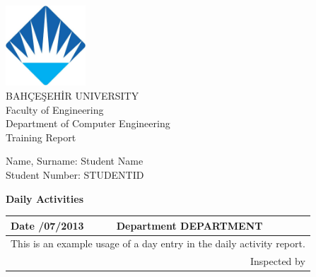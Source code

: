 \documentclass[pdftex,12pt,a4paper]{extreport}
\begin{document}
\begin{titlepage}
\begin{center}

\includegraphics[height=3cm,width=3cm]{bau.png}\\
[1.0cm]
\Large BAHÇEŞEHİR UNIVERSITY\\
[3.0cm]
\Large Faculty of Engineering\\
[3.0cm]
\Large Department of Computer Engineering\\
[3.0cm]
\large Training Report\\
[4.0cm]
\end{center}
\large Name, Surname:
\large Student Name\\
\large Student Number:
\large STUDENTID\\
\vfill

\end{titlepage}

\newenvironment{dailyactivity}[2]
{
    \newpage
    \begin{center}
    \textbf{Daily Activities}\\[1cm]
    \begin{tabular}{|p{2.5cm}|p{12.5cm}|}
        \hline
        \textbf{Date} \newline #1 & \textbf{Department} \newline DEPARTMENT\\
        \hline
        \multicolumn{2}{|p{15.5cm}|}{#2}\\[19cm]
}
{
        \hline
        \multicolumn{2}{|r|}{Inspected by}\\[2cm]
        \hline
    \end{tabular}
    \end{center}
}

\begin{dailyactivity}{10/07/2013}
{
This is an example usage of a day entry in the daily activity report.
}
\end{dailyactivity}
\end{document}
